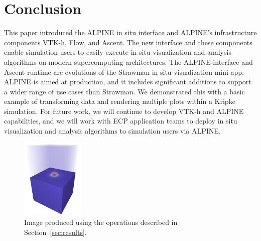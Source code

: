 \documentclass[sigconf]{acmart}
\begin{document}


\maketitle







\section{Conclusion}

This paper introduced the ALPINE in situ interface and ALPINE's infrastructure components VTK-h, Flow, and Ascent.
%
The new interface and these components enable simulation users to easily execute in situ visualization and analysis algorithms
on modern supercomputing architectures. 
%
The ALPINE interface and Ascent runtime are evolutions of the Strawman in situ visualization mini-app. ALPINE is aimed at production, and it includes significant additions to support a wider range of use cases than Strawman. We demonstrated this with a basic example of transforming data and rendering multiple plots within a Kripke simulation. 
%
%
%
For future work, we will continue to develop VTK-h and ALPINE capabilities, and we will work with ECP application teams to deploy in situ visualization and analysis algorithms to simulation users via ALPINE.
 
\begin{figure}
	\includegraphics[width=3cm]{images/kripke}
	\caption{\label{kripke}Image produced using the operations described in Section~\ref{sec:results}.}
\end{figure}





 
\end{document}
